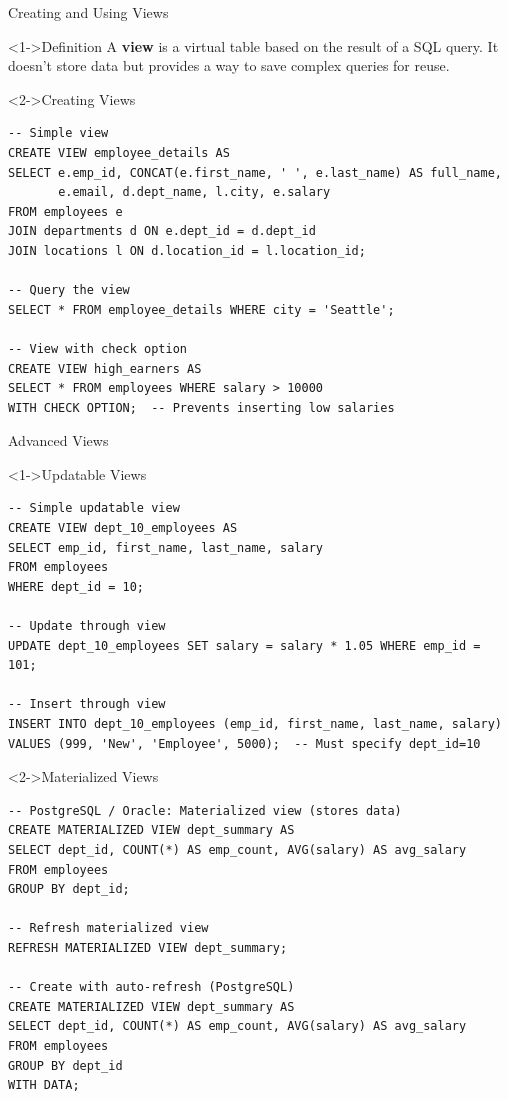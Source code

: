 \documentclass[aspectratio=169,11pt]{beamer}
\begin{document}
\begin{frame}[fragile]{Creating and Using Views}
\begin{block}<1->{Definition}
A \textbf{view} is a virtual table based on the result of a SQL query. It doesn't store data but provides a way to save complex queries for reuse.
\end{block}

\pause
\begin{exampleblock}<2->{Creating Views}
\begin{lstlisting}
-- Simple view
CREATE VIEW employee_details AS
SELECT e.emp_id, CONCAT(e.first_name, ' ', e.last_name) AS full_name,
       e.email, d.dept_name, l.city, e.salary
FROM employees e
JOIN departments d ON e.dept_id = d.dept_id
JOIN locations l ON d.location_id = l.location_id;

-- Query the view
SELECT * FROM employee_details WHERE city = 'Seattle';

-- View with check option
CREATE VIEW high_earners AS
SELECT * FROM employees WHERE salary > 10000
WITH CHECK OPTION;  -- Prevents inserting low salaries
\end{lstlisting}
\end{exampleblock}
\end{frame}

\begin{frame}[fragile]{Advanced Views}
\begin{exampleblock}<1->{Updatable Views}
\begin{lstlisting}
-- Simple updatable view
CREATE VIEW dept_10_employees AS
SELECT emp_id, first_name, last_name, salary
FROM employees
WHERE dept_id = 10;

-- Update through view
UPDATE dept_10_employees SET salary = salary * 1.05 WHERE emp_id = 101;

-- Insert through view
INSERT INTO dept_10_employees (emp_id, first_name, last_name, salary)
VALUES (999, 'New', 'Employee', 5000);  -- Must specify dept_id=10
\end{lstlisting}
\end{exampleblock}

\pause
\begin{exampleblock}<2->{Materialized Views}
\begin{lstlisting}
-- PostgreSQL / Oracle: Materialized view (stores data)
CREATE MATERIALIZED VIEW dept_summary AS
SELECT dept_id, COUNT(*) AS emp_count, AVG(salary) AS avg_salary
FROM employees
GROUP BY dept_id;

-- Refresh materialized view
REFRESH MATERIALIZED VIEW dept_summary;

-- Create with auto-refresh (PostgreSQL)
CREATE MATERIALIZED VIEW dept_summary AS
SELECT dept_id, COUNT(*) AS emp_count, AVG(salary) AS avg_salary
FROM employees
GROUP BY dept_id
WITH DATA;
\end{lstlisting}
\end{exampleblock}
\end{frame}
\end{document}
